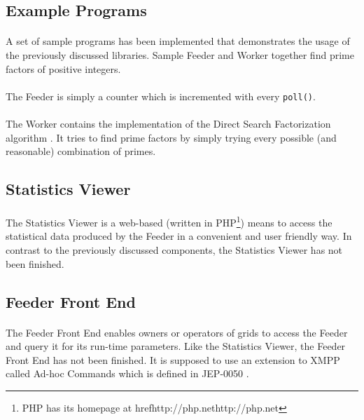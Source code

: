 \subsection{Example Programs}
\label{sec:samples}
\paragraph{}
A set of sample programs has been implemented that demonstrates the usage of the previously discussed libraries. Sample Feeder and Worker together find prime factors of positive integers.

\paragraph{}
The Feeder is simply a counter which is incremented with every \texttt{poll()}.

\paragraph{}
The Worker contains the implementation of the Direct Search Factorization algorithm \cite{mathworld001,wikipedia007}. It tries to find prime factors by simply trying every possible (and reasonable) combination of primes.


\subsection{Statistics Viewer}
\paragraph{}
The Statistics Viewer is a web-based (written in PHP\footnote{PHP has its homepage at href{http://php.net}{http://php.net}}) means to access the statistical data produced by the Feeder in a convenient and user friendly way. In contrast to the previously discussed components, the Statistics Viewer has not been finished.


\subsection{Feeder Front End}
\paragraph{}
The Feeder Front End enables owners or operators of grids to access the Feeder and query it for its run-time parameters. Like the Statistics Viewer, the Feeder Front End has not been finished. It is supposed to use an extension to XMPP called Ad-hoc Commands which is defined in JEP-0050 \cite{jep0050}.

